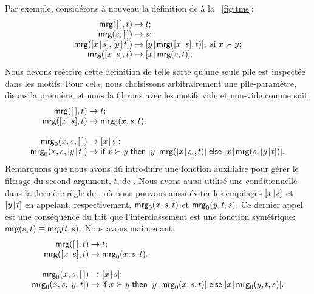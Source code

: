Par exemple, considérons à nouveau la définition de  à la
\fig~\vref{fig:tms}:
\begin{equation*}
\begin{array}{@{}r@{\;}l@{\;}l@{}}
\fun{mrg}(\el,t)         & \rightarrow & t;\\
\fun{mrg}(s,\el)         & \rightarrow & s;\\
\fun{mrg}(\cons{x}{s},\cons{y}{t}) & \rightarrow
                         & \cons{y}{\fun{mrg}(\cons{x}{s},t)},\;
                           \text{si \(x \succ y\)};\\
\fun{mrg}(\cons{x}{s},t) & \rightarrow & \cons{x}{\fun{mrg}(s,t)}.
\end{array}
\end{equation*}
Nous devons réécrire cette définition de telle sorte qu'une seule pile
est inspectée dans les motifs. Pour cela, nous choisissons
arbitrairement une pile-paramètre, disons la première, et nous la
filtrons avec les motifs vide et non-vide comme suit:
\begin{equation*}
\begin{array}{@{}r@{\;}l@{\;}l@{}}
\fun{mrg}(\el,t)         & \rightarrow & t;\\
\fun{mrg}(\cons{x}{s},t) & \rightarrow & \fun{mrg}_0(x,s,t).\\
\\
\fun{mrg}_0(x,s,\el)     & \rightarrow & \cons{x}{s};\\
\fun{mrg}_0(x,s,\cons{y}{t}) & \rightarrow
& \fun{if} \; x \succ y \; \fun{then} \;
  \cons{y}{\fun{mrg}(\cons{x}{s},t)} \;
  \fun{else} \; \cons{x}{\fun{mrg}(s,\cons{y}{t})}.
\end{array}
\end{equation*}
Remarquons que nous avons dû introduire une fonction auxiliaire
 pour gérer le filtrage du second argument, \(t\), de
. Nous avons aussi utilisé une conditionnelle dans la
dernière règle de , où nous pouvons aussi éviter les
empilages \([{x}\!\mid\!{s}]\) et \([{y}\!\mid\!{t}]\) en appelant,
respectivement, \(\textsf{mrg}_0(x,s,t)\) et \(\textsf{mrg}_0(y,t,s)\). Ce
dernier appel est une conséquence du fait que l'interclassement est
une fonction symétrique: \(\textsf{mrg}(s,t) \equiv
\textsf{mrg}(t,s)\). Nous avons maintenant:
\begin{equation*}
\begin{array}{@{}r@{\;}l@{\;}l@{}}
\fun{mrg}(\el,t)         & \rightarrow & t;\\
\fun{mrg}(\cons{x}{s},t) & \rightarrow & \fun{mrg}_0(x,s,t).\\
\\
\fun{mrg}_0(x,s,\el)     & \rightarrow & \cons{x}{s};\\
\fun{mrg}_0(x,s,\cons{y}{t}) & \rightarrow
& \fun{if} \; x \succ y \; \fun{then} \;
  \cons{y}{\fun{mrg}_0(x,s,t)} \;
  \fun{else} \; \cons{x}{\fun{mrg}_0(y,t,s)}.
\end{array}
\end{equation*}

